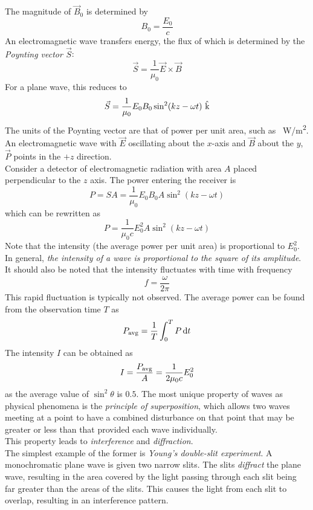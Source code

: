 \documentclass{subfiles}
\begin{document}
				The magnitude of \(\vec{B}_0\) is determined by
				\[B_0 = \frac{E_0}{c}\]
				An electromagnetic wave transfers energy, the flux of which is determined by the \textit{Poynting vector \(\vec{S}\)}:
				\[\vec{S} = \frac{1}{\mu_0}\vec{E} \times \vec{B} \tag{Poynting vector}\]
				For a plane wave, this reduces to
				\[\vec{S} = \frac{1}{\mu_0}E_0B_0\sin^2(kz - \omega t)\text{ \^k}\]
				The units of the Poynting vector are that of power per unit area, such as \SI{}{W/m^2}. \\
				An electromagnetic wave with \(\vec{E}\) oscillating about the \(x\)-axis and \(\vec{B}\) about the \(y\), \(\vec{P}\) points in the \(+z\) direction. \\
				Consider a detector of electromagnetic radiation with area \(A\) placed perpendicular to the \(z\) axis. The power entering the receiver is
				\[
					P = SA
						= \frac{1}{\mu_0}E_0B_0A\sin^2(kz-\omega t)
				\]
				which can be rewritten as
				\[P = \frac{1}{\mu_0c}E_0^2A\sin^2(kz - \omega t)\]
				Note that the intensity (the average power per unit area) is proportional to \(E_0^2\). In general, \textit{the intensity of a wave is proportional to the square of its amplitude}. \\
				It should also be noted that the intensity fluctuates with time with frequency
				\[f = \frac{\omega}{2\pi}\] 
				This rapid fluctuation is typically not observed. The average power can be found from the observation time \(T\) as
				\[P_{\text{avg}} = \frac{1}{T}\int_0^T P \dd{t}\]
				The intensity \(I\) can be obtained as
				\[
					I = \frac{P_{\text{avg}}}{A}
						= \frac{1}{2\mu_0 c}E_0^2
				\]
				as the average value of \(\sin^2\theta\) is \(0.5\).
				The most unique property of waves as physical phenomena is the \textit{principle of superposition}, which allows two waves meeting at a point to have a combined disturbance on that point that may be greater or less than that provided each wave individually. \\
				This property leads to \textit{interference} and \textit{diffraction}. \\
				The simplest example of the former is \textit{Young's double-slit experiment}. A monochromatic plane wave is given two narrow slits. The slits \textit{diffract} the plane wave, resulting in the area covered by the light passing through each slit being far greater than the areas of the slits. This causes the light from each slit to overlap, resulting in an interference pattern. \\
\end{document}
